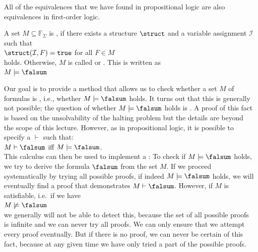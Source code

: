 \remarkEng
All of the equivalences that we have found in propositional logic are also equivalences in first-order logic.
\eox

\begin{Definition}[Satisfiable]
    A set $M \subseteq \mathbb{F}_\Sigma$ is ,
    if there exists a structure $\struct$ and a variable assignment $\mathcal{I}$ such that 
    \\[0.2cm]
    \hspace*{1.3cm}
    $\struct(\mathcal{I},F) = \mathtt{true}$ \quad for all $F \in M$ 
    \\[0.2cm]
    holds. Otherwise, $M$ is called  or .
    This is written as \\[0.2cm]
    \hspace*{1.3cm} $M \models \falsum$ 
    \eox
\end{Definition}

\noindent
Our goal is to provide a method that allows us to check
whether a set $M$ of formulas is , i.e., whether 
$M \models \falsum$ holds. It turns out that this is generally not
possible; the question of whether $M \models \falsum$ holds is . A proof
of this fact is based on the unsolvability of the halting problem but the details are beyond the scope of
this lecture. 
However, as in propositional logic, it is possible
to specify a  $\vdash$ such that: \\[0.2cm]
\hspace*{1.3cm} $M \vdash \falsum$ \quad iff \quad $M \models \falsum$. \\[0.2cm]
This calculus can then be used to implement a
: To check if
$M \models \falsum$ holds, we try to derive the formula $\falsum$
from the set $M$.
If we proceed systematically by trying all possible proofs,
if indeed $M \models \falsum$ holds, we will eventually find a proof
that demonstrates $M \vdash \falsum$. However, if $M$ is satisfiable, i.e.~if we have  \\[0.2cm]
\hspace*{1.3cm}  $M \not\models \falsum$ \\[0.2cm]
we generally will not be able to detect this, because the set of all possible proofs is infinite
and we can never try all proofs. We can only ensure that
we attempt every proof eventually. But if there is no proof, we can
never be certain of this fact, because at any given time we have only tried a part of the
possible proofs.

